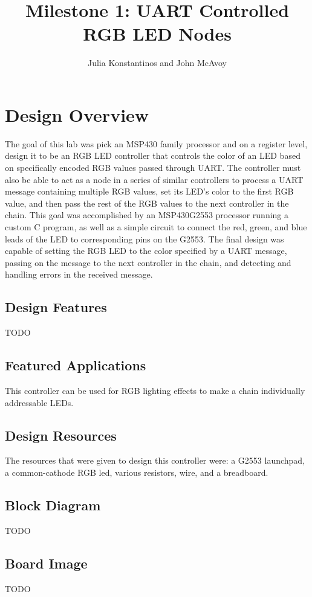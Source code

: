 \documentclass{hitec}
\title{Milestone 1: UART Controlled RGB LED Nodes}
\author{Julia Konstantinos and John McAvoy}
\begin{document}
\maketitle
\tableofcontents

\section{Design Overview}
The goal of this lab was pick an MSP430 family processor and on a register level, design it to be an RGB LED controller that controls the color of an LED based on specifically encoded RGB values passed through UART. The controller must also be able to act as a node in a series of similar controllers to process a UART message containing multiple RGB values, set its LED's color to the first RGB value, and then pass the rest of the RGB values to the next controller in the chain. This goal was accomplished by an MSP430G2553 processor running a custom C program, as well as a simple circuit to connect the red, green, and blue leads of the LED to corresponding pins on the G2553. The final design was capable of setting the RGB LED to the color specified by a UART message, passing on the message to the next controller in the chain, and detecting and handling errors in the received message. 

\subsection{Design Features}
TODO

\subsection{Featured Applications}
This controller can be used for RGB lighting effects to make a chain individually addressable LEDs.

\subsection{Design Resources}
The resources that were given to design this controller were: a G2553 launchpad, a common-cathode RGB led, various resistors, wire, and a breadboard.

\subsection{Block Diagram}
TODO

\subsection{Board Image}
TODO
\end{document}

